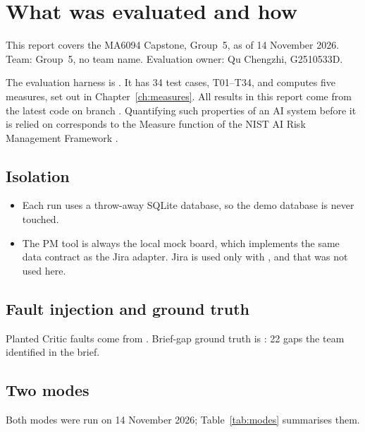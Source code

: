 \chapter{What was evaluated and how}
\label{ch:setup}

This report covers the MA6094 Capstone, Group~5, as of 14 November 2026. Team: Group~5, no team name. Evaluation owner: Qu Chengzhi, G2510533D.

The evaluation harness is . It has 34 test cases, T01--T34, and computes five measures, set out in Chapter~\ref{ch:measures}. All results in this report come from the latest code on branch . Quantifying such properties of an AI system before it is relied on corresponds to the Measure function of the NIST AI Risk Management Framework \parencite{nist2023airmf}.

\section{Isolation}
\begin{itemize}
  \item Each run uses a throw-away SQLite database, so the demo database is never touched.
  \item The PM tool is always the local mock board, which implements the same data contract as the Jira adapter. Jira is used only with , and that was not used here.
\end{itemize}

\section{Fault injection and ground truth}
Planted Critic faults come from . Brief-gap ground truth is : 22 gaps the team identified in the brief.

\section{Two modes}
Both modes were run on 14 November 2026; Table~\ref{tab:modes} summarises them.

